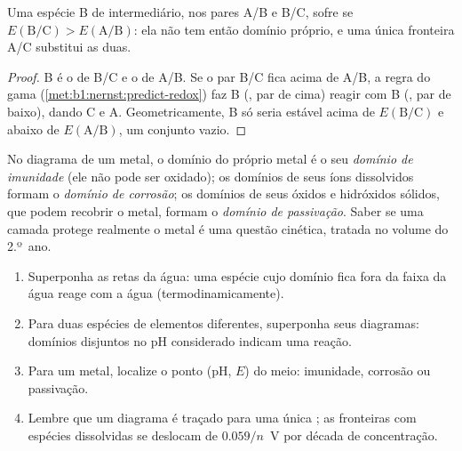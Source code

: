 \begin{proposition}\label{prop:b1:e-ph-diagrams:disproportionation-criterion}
Uma espécie B de  intermediário, nos pares A/B e B/C,
sofre  se $E(\mathrm{B}/\mathrm{C}) > E(\mathrm{A}/\mathrm{B})$:
ela não tem então domínio próprio, e uma única fronteira A/C substitui
as duas.
\end{proposition}

\begin{proof}
B é o  de B/C e o  de A/B. Se o par B/C fica acima de
A/B, a regra do gama (\cref{met:b1:nernst:predict-redox}) faz B
(, par de cima) reagir com B (, par de baixo), dando C e
A. Geometricamente, B só seria estável acima de $E(\mathrm{B}/\mathrm{C})$
e abaixo de $E(\mathrm{A}/\mathrm{B})$, um conjunto vazio.
\end{proof}

\begin{definition}\label{def:b1:e-ph-diagrams:corrosion-domains}
No diagrama de um metal, o domínio do próprio metal é o seu
\emph{domínio de imunidade} (ele não pode ser
oxidado); os domínios de seus íons dissolvidos formam o \emph{domínio de
corrosão}; os domínios de seus óxidos e
hidróxidos sólidos, que podem recobrir o metal, formam o \emph{domínio
de passivação}. Saber se uma camada
protege realmente o metal é uma questão cinética, tratada no volume do
2.º~ano.
\end{definition}

\begin{method}\label{met:b1:e-ph-diagrams:read}
\begin{enumerate}
  \item Superponha as retas da água: uma espécie cujo domínio fica fora
        da faixa da água reage com a água (termodinamicamente).
  \item Para duas espécies de elementos diferentes, superponha seus
        diagramas: domínios disjuntos no pH considerado indicam uma
        reação.
  \item Para um metal, localize o ponto (pH, $E$) do meio: imunidade,
        corrosão ou passivação.
  \item Lembre que um diagrama é traçado para uma única ; as fronteiras com espécies dissolvidas se deslocam de
        $0.059/n$~V por década de concentração.
\end{enumerate}
\end{method}

